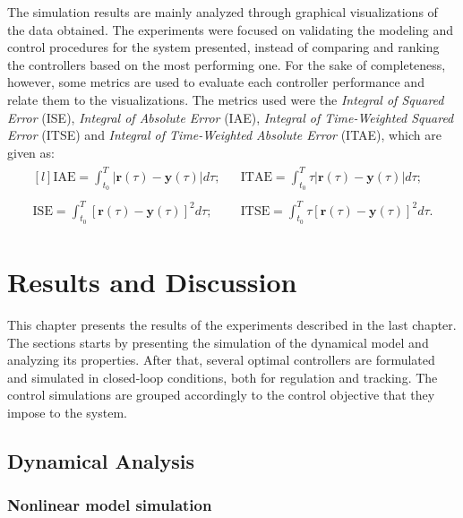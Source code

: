 \documentclass[a4paper,11pt]{book}
\numberwithin{figure}{chapter}
\numberwithin{equation}{chapter}
\numberwithin{table}{chapter}
\theoremstyle{definition}
\begin{document}
The simulation results are mainly analyzed through graphical visualizations of the data obtained. The experiments were focused on validating the modeling and control procedures for the system presented, instead of comparing and ranking the controllers based on the most performing one. For the sake of completeness, however, some metrics are used to evaluate each controller performance and relate them to the visualizations. The metrics used were the \textit{Integral of Squared Error} (ISE), \textit{Integral of Absolute Error} (IAE), \textit{Integral of Time-Weighted Squared Error} (ITSE) and \textit{Integral of Time-Weighted Absolute Error} (ITAE), which are given as:
\begin{align}
\begin{matrix*}[l] \displaystyle
	\text{IAE} = \displaystyle\int_{t_0}^{T} | \bm{r}(\tau) - \bm{y}(\tau) | d\tau; & & \text{ITAE} = \displaystyle\int_{t_0}^{T} \tau | \bm{r}(\tau) - \bm{y}(\tau) | d\tau;\\ \\
	\text{ISE} = \displaystyle\int_{t_0}^{T} \left[ \bm{r}(\tau) - \bm{y}(\tau) \right]^2 d\tau; & & \text{ITSE} = \displaystyle\int_{t_0}^{T} \tau \left[ \bm{r}(\tau) - \bm{y}(\tau) \right]^2 d\tau.
\end{matrix*}
\end{align}


\clearpage
\chapter{Results and Discussion}

This chapter presents the results of the experiments described in the last chapter. The sections starts by presenting the simulation of the dynamical model and analyzing its properties. After that, several optimal controllers are formulated and simulated in closed-loop conditions, both for regulation and tracking. The control simulations are grouped accordingly to the control objective that they impose to the system.

\section{Dynamical Analysis}

\subsection{Nonlinear model simulation}
\end{document}
